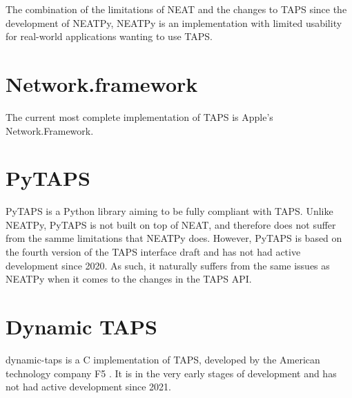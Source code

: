 The combination of the limitations of NEAT and the changes to TAPS
since the development of NEATPy, NEATPy is an implementation with
limited usability for real-world applications wanting to use TAPS.

\section{Network.framework}
The current most complete implementation of TAPS is Apple's
Network.Framework. 

\section{PyTAPS}
PyTAPS \cite{frankePythonasynciotaps2025} is a Python library aiming
to be fully compliant with TAPS. Unlike NEATPy, PyTAPS is not built
on top of NEAT, and therefore does not suffer from the samme limitations
that NEATPy does. However, PyTAPS is based on the fourth version of the TAPS
interface draft \cite{frankePythonasynciotaps2025} and has not had active
development since 2020. As such, it naturally suffers from the same
issues as NEATPy when it comes to the changes in the TAPS API.

\section{Dynamic TAPS}
dynamic-taps is a C implementation of TAPS, developed by the
American technology company F5 \cite{dukeDynamictaps2025}. It
is in the very early stages of development and has not had
active development since 2021.


